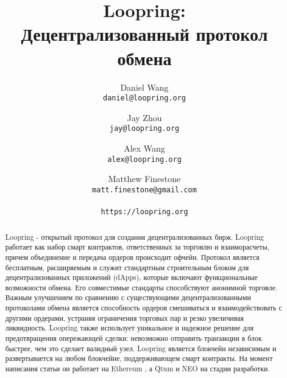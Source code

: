 \documentclass[utf8,nofonts]{article}
\title{\textbf{Loopring:}\\\textbf{Децентрализованный протокол обмена}}
\author{
  Daniel Wang\\
  \texttt{daniel@loopring.org}\\
  \and
  	Jay Zhou\\
  	\texttt{jay@loopring.org}\\
  	\and
  	Alex Wang\\
  	\texttt{alex@loopring.org}\\
  	\and
  	Matthew Finestone\\
  	\texttt{matt.finestone@gmail.com}\\ 
  \\
  \texttt{https://loopring.org}
 }
\begin{document}
\maketitle


\begin{abstract}
	Loopring - открытый протокол для создания децентрализованных бирж. Loopring работает как набор смарт контрактов, ответственных за торговлю и взаиморасчеты, причем объединение и передача ордеров происходит офчейн. Протокол является бесплатным, расширяемым и служит стандартным строительным блоком для децентрализованных приложений (dApps), которые включают функциональные возможности обмена. Его совместимые стандарты способствуют анонимной торговле. Важным улучшением по сравнению с существующими децентрализованными протоколами обмена является способность ордеров смешиваться и взаимодействовать с другими ордерами, устраняя ограничения торговых пар и резко увеличивая ликвидность. Loopring также использует уникальное и надежное решение для предотвращения опережающей сделки: невозможно отправить транзакции в блок быстрее, чем это сделает валидный узел. Loopring является блокчейн независимым и развертывается на любом блокчейне, поддерживающем смарт контракты. На момент написания статьи он работает на Ethereum \cite{buterin2017ethereum} \cite{wood2014ethereum}, а Qtum \cite{dai2017smart} и NEO \cite{atterlonn2018distributed} на стадии разработки.
\end{abstract}
\end{document}
